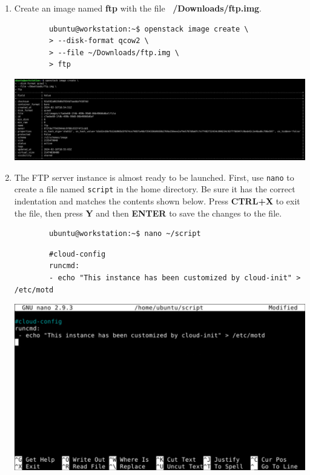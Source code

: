 \documentclass[letterpaper, 12pt]{article}
\begin{document}
\begin{enumerate}
    \item Create an image named \textbf{ftp} with the file \textbf{~/Downloads/ftp.img}.
    \begin{lstlisting}
        ubuntu@workstation:~$ openstack image create \
        > --disk-format qcow2 \
        > --file ~/Downloads/ftp.img \
        > ftp
    \end{lstlisting}

    \begin{center}
        \includegraphics[width=\linewidth]{images/part1/step34.png}
    \end{center}

    \item The FTP server instance is almost ready to be launched. First, use \texttt{nano} to create a file named
    \texttt{script} in the home directory. Be sure it has the correct indentation and matches the contents shown below.
    Press \textbf{CTRL+X} to exit the file, then press \textbf{Y} and then \textbf{ENTER} to save the changes to the
    file.
    \begin{lstlisting}
        ubuntu@workstation:~$ nano ~/script
    \end{lstlisting}
    \begin{lstlisting}
        #cloud-config
        runcmd:
        - echo "This instance has been customized by cloud-init" > /etc/motd
    \end{lstlisting}

    \begin{center}
        \includegraphics[width=\linewidth]{images/part1/step35.png}
    \end{center}


\end{enumerate}
\end{document}
